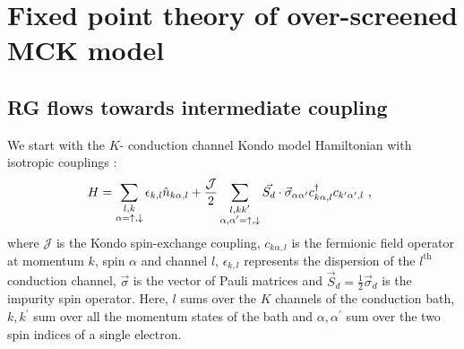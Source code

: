 \documentclass{iopart}
\begin{document}
\section{Fixed point theory of over-screened MCK model}
\label{rg_section}
\subsection{RG flows towards intermediate coupling}
\label{rg_flow_section}
We start with the \(K\)- conduction channel Kondo model Hamiltonian with isotropic couplings \cite{Noz_blandin_1980}:
\begin{eqnarray}
	\label{mc_ham}
	\hspace*{-5pt}H = \sum_{\substack{l,k\\\alpha=\uparrow,\downarrow}}\epsilon_{k,l} \hat n_{k\alpha,l} + \frac{\mathcal{J}}{2}\sum_{\substack{l,kk^\prime\\\alpha,\alpha^\prime= \uparrow,\downarrow}} \vec{S_d}\cdot\vec{\sigma}_{\alpha\alpha^\prime}c_{k\alpha,l}^\dagger c_{k^\prime\alpha^\prime, l}~,
\end{eqnarray}
where \(\mathcal{J}\) is the Kondo spin-exchange coupling, \(c_{k\alpha,l}\) is the fermionic field operator at momentum \(k\), spin \(\alpha\) and channel \(l\), \(\epsilon_{k,l}\) represents the dispersion of the \(l^\mathrm{th}\) conduction channel, \(\vec \sigma\) is the vector of Pauli matrices and \(\vec S_d = \frac{1}{2}\vec \sigma_d\) is the impurity spin operator. Here, \(l\) sums over the \(K\) channels of the conduction bath, \(k,k^\prime\) sum over all the momentum states of the bath and \(\alpha,\alpha^\prime\) sum over the two spin indices of a single electron.
\end{document}
